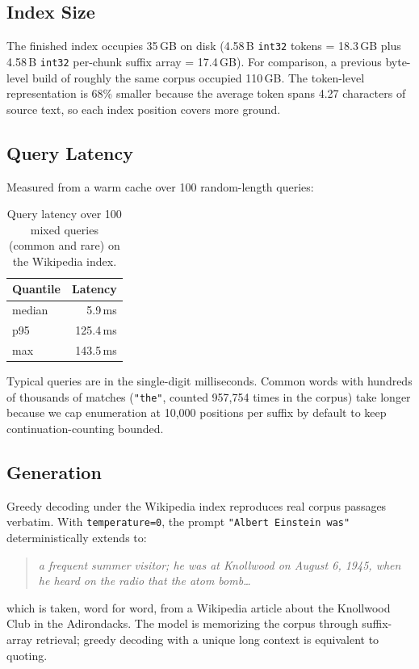 \documentclass[11pt]{article}
\begin{document}
\subsection{Index Size}

The finished index occupies 35\,GB on disk (4.58\,B \texttt{int32} tokens = 18.3\,GB plus 4.58\,B \texttt{int32} per-chunk suffix array = 17.4\,GB). For comparison, a previous byte-level build of roughly the same corpus occupied 110\,GB. The token-level representation is 68\% smaller because the average token spans 4.27 characters of source text, so each index position covers more ground.

\subsection{Query Latency}

Measured from a warm cache over 100 random-length queries:

\begin{table}[h]
\centering
\begin{tabular}{lr}
\toprule
Quantile & Latency \\
\midrule
median   & 5.9\,ms \\
p95      & 125.4\,ms \\
max      & 143.5\,ms \\
\bottomrule
\end{tabular}
\caption{Query latency over 100 mixed queries (common and rare) on the Wikipedia index.}
\end{table}

Typical queries are in the single-digit milliseconds. Common words with hundreds of thousands of matches (\texttt{"the"}, counted 957{,}754 times in the corpus) take longer because we cap enumeration at 10{,}000 positions per suffix by default to keep continuation-counting bounded.

\subsection{Generation}

Greedy decoding under the Wikipedia index reproduces real corpus passages verbatim. With \texttt{temperature=0}, the prompt \texttt{"Albert Einstein was"} deterministically extends to:
\begin{quote}
\small
\itshape
a frequent summer visitor; he was at Knollwood on August 6, 1945, when he heard on the radio that the atom bomb\ldots
\end{quote}
which is taken, word for word, from a Wikipedia article about the Knollwood Club in the Adirondacks. The model is memorizing the corpus through suffix-array retrieval; greedy decoding with a unique long context is equivalent to quoting.
\end{document}
